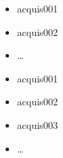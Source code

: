 \begin{acquis}
    \begin{itemize}
    \item acquis001
    \item acquis002
    \item \ldots
    \end{itemize}
    \pagebreak
     \begin{itemize}
     \item acquis001
     \item acquis002
     \item acquis003
     \item \ldots
     \end{itemize}
\end{acquis}